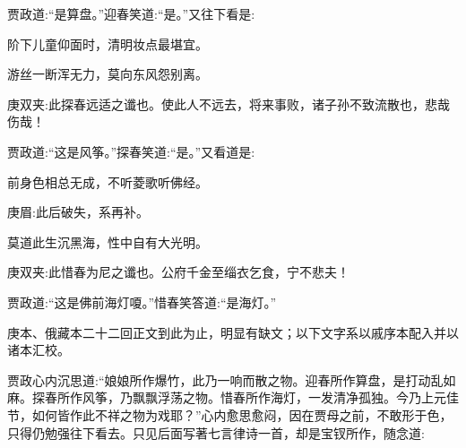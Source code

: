 \begin{parag}
    贾政道:“是算盘。”迎春笑道:“是。”又往下看是:
\end{parag}


\begin{poem}
    \begin{pl}阶下儿童仰面时，清明妆点最堪宜。\end{pl}

    \begin{pl}游丝一断浑无力，莫向东风怨别离。\end{pl}
    \begin{note}庚双夹:此探春远适之谶也。使此人不远去，将来事败，诸子孙不致流散也，悲哉伤哉！\end{note}
\end{poem}


\begin{parag}
    贾政道:“这是风筝。”探春笑道:“是。”又看道是:
\end{parag}


\begin{poem}
    \begin{pl}前身色相总无成，不听菱歌听佛经。\end{pl}
    \begin{note}庚眉:此后破失，系再补。\end{note}

    \begin{pl}莫道此生沉黑海，性中自有大光明。\end{pl}
    \begin{note}庚双夹:此惜春为尼之谶也。公府千金至缁衣乞食，宁不悲夫！ \end{note}
\end{poem}


\begin{parag}
    贾政道:“这是佛前海灯嗄。”惜春笑答道:“是海灯。”
\end{parag}


\begin{note}
    庚本、俄藏本二十二回正文到此为止，明显有缺文；以下文字系以戚序本配入并以诸本汇校。
\end{note}


\begin{parag}
    贾政心内沉思道:“娘娘所作爆竹，此乃一响而散之物。迎春所作算盘，是打动乱如麻。探春所作风筝，乃飘飘浮荡之物。惜春所作海灯，一发清净孤独。今乃上元佳节，如何皆作此不祥之物为戏耶？”心内愈思愈闷，因在贾母之前，不敢形于色，只得仍勉强往下看去。只见后面写著七言律诗一首，却是宝钗所作，随念道:
\end{parag}


